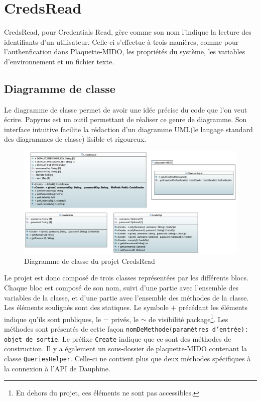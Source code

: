 \chapter[CredsRead]{CredsRead\raisebox{.3\baselineskip}{\normalsize\footnotemark}}

CredsRead, pour Credentials Read, gère comme son nom l'indique la lecture des identifiants d'un utilisateur. Celle-ci s'effectue à trois manières, comme pour l'authenfication dans Plaquette-MIDO, les propriétés du système, les variables d'environnement et un fichier texte.

\section{Diagramme de classe}
Le diagramme de classe permet de avoir une idée précise du code que l'on veut écrire. Papyrus est un outil permettant de réaliser ce genre de diagramme. Son interface intuitive facilite la rédaction d'un diagramme UML(le langage standard des diagrammes de classe) lisible et rigoureux. 

\begin{figure}[!h]
    \begin{center}
    \includegraphics[width=\textwidth]{assets/doc.png}
    \end{center}
    \caption{Diagramme de classe du projet CredsRead}
\end{figure}


Le projet est donc composé de trois classes représentées par les différents blocs. Chaque bloc est composé de son nom, suivi d'une partie avec l'ensemble des variables de la classe, et d'une partie avec l'ensemble des méthodes de la classe. Les éléments soulignés sont des statiques. Le symbole $+$ précédant les éléments indique qu'ils sont publiques, le $-$ privés, le $\sim$ de visibilité package\footnote{En dehors du projet, ces éléments ne sont pas accessibles.}. Les méthodes sont présentés de cette façon \texttt{nomDeMethode(paramètres d'entrée): objet de sortie}. Le préfixe \texttt{Create} indique que ce sont des méthodes de construction. Il y a également un sous-dossier de plaquette-MIDO contenant la classe \texttt{QueriesHelper}. Celle-ci ne contient plus que deux méthodes spécifiques à la connexion à l'API de Dauphine.


